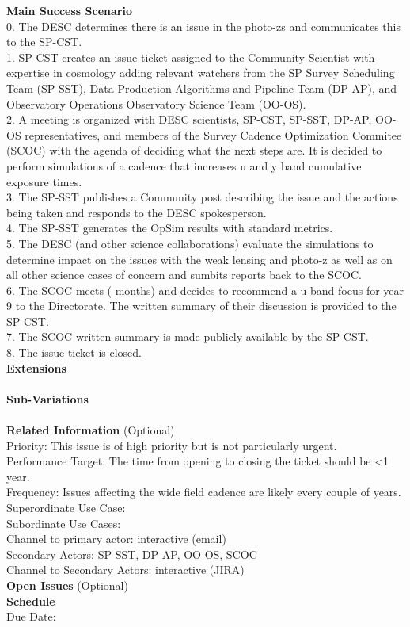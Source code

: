 {\bf Main Success Scenario} \\
0. The DESC determines there is an issue in the photo-zs and communicates this to the SP-CST. \\
1. SP-CST creates an issue ticket assigned to the Community Scientist with expertise in cosmology adding relevant watchers from the SP Survey Scheduling Team (SP-SST), Data Production Algorithms and Pipeline Team (DP-AP), and Observatory Operations Observatory Science Team (OO-OS). \\
2. A meeting is organized with DESC scientists, SP-CST, SP-SST, DP-AP, OO-OS representatives, and members of the Survey Cadence Optimization Commitee (SCOC) with the agenda of deciding what the next steps are. It is decided to perform simulations of a cadence that increases u and y band cumulative exposure times. \\
3. The SP-SST publishes a Community post describing the issue and the actions being taken and responds to the DESC spokesperson. \\
4. The SP-SST generates the OpSim results with standard metrics. \\ 
5. The DESC (and other science collaborations) evaluate the simulations to determine impact on the issues with the weak lensing and photo-z as well as on all other science cases of concern and sumbits reports back to the SCOC. \\
6. The SCOC meets ( months) and decides to recommend a u-band focus for year 9 to the Directorate. The written summary of their discussion is provided to the SP-CST. \\
7. The SCOC written summary is made publicly available by the SP-CST. \\
8. The issue ticket is closed. \\


{\bf Extensions} \\
\\

{\bf Sub-Variations} \\
\\

{\bf Related Information} (Optional) \\
Priority: This issue is of high priority but is not particularly urgent. \\
Performance Target: The time from opening to closing the ticket should be <1 year. \\
Frequency: Issues affecting the wide field cadence are likely every couple of years. \\
Superordinate Use Case:  \\
Subordinate Use Cases: \\
Channel to primary actor: interactive (email) \\
Secondary Actors: SP-SST, DP-AP, OO-OS, SCOC \\
Channel to Secondary Actors: interactive (JIRA) \\

{\bf Open Issues} (Optional) \\

{\bf Schedule} \\
Due Date: \\
